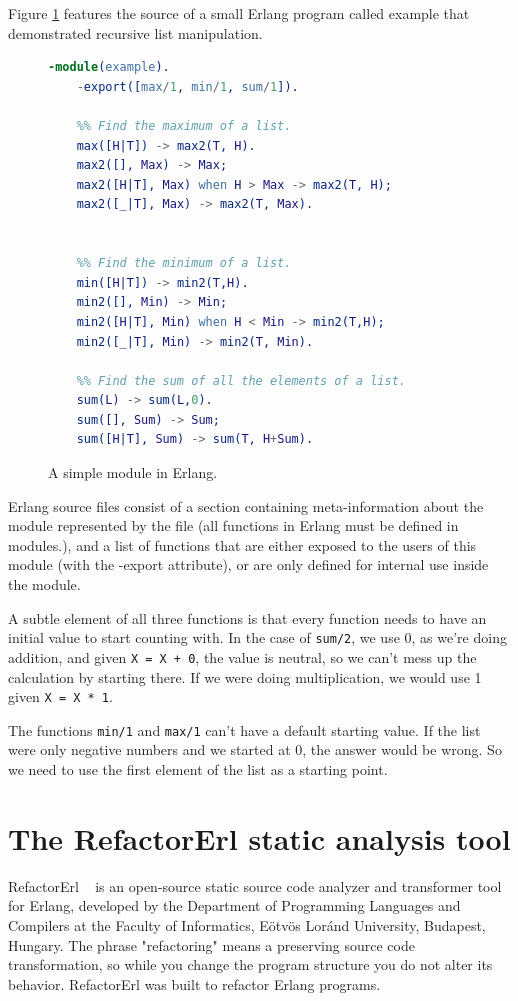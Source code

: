 Figure \ref{fig:example_erlang} features the source of a small Erlang program
called example that demonstrated recursive list manipulation.
\begin{figure}[ht]
	\begin{lstlisting}[extendedchars=true, language=Erlang, basicstyle=\footnotesize\ttfamily, keywordstyle=\color{red}]
	-module(example). 
	-export([max/1, min/1, sum/1]).
	
	%% Find the maximum of a list.
	max([H|T]) -> max2(T, H).
	max2([], Max) -> Max;
	max2([H|T], Max) when H > Max -> max2(T, H);
	max2([_|T], Max) -> max2(T, Max).
	

	%% Find the minimum of a list.
	min([H|T]) -> min2(T,H).
	min2([], Min) -> Min;
	min2([H|T], Min) when H < Min -> min2(T,H);
	min2([_|T], Min) -> min2(T, Min).
	
	%% Find the sum of all the elements of a list.
	sum(L) -> sum(L,0).
	sum([], Sum) -> Sum;
	sum([H|T], Sum) -> sum(T, H+Sum).
	\end{lstlisting}
\caption{A simple module in Erlang.}
\label{fig:example_erlang}
\end{figure}

Erlang source files consist of a section containing meta-information about the module represented by the file (all functions in Erlang must be defined in
modules.), and a list of functions that are either exposed to the users of this module (with the -export attribute), or are only defined for internal use inside the module.  

A subtle element of all three functions is that every function needs to have an initial value to start counting with. In the case of \texttt{sum/2}, we use 0, as we’re doing addition, and given \texttt{X = X + 0}, the value is neutral, so we can’t mess up the calculation by starting there. If we were doing multiplication, we would use 1 given \texttt{X = X * 1}. 

The functions \texttt{min/1} and \texttt{max/1} can’t have a default starting value. If the list were only negative numbers and we started at 0, the answer would be wrong. So we need to use the first element of the list as a starting point.

\section{The RefactorErl static analysis tool} 

RefactorErl ~\cite{refactorerl1, refactorerl2} is an open-source static source code analyzer and transformer tool for Erlang, developed by the Department of Programming Languages and Compilers at the Faculty of Informatics, Eötvös Loránd University, Budapest, Hungary. The phrase "refactoring" means a preserving source code transformation, so while you change the program structure you do not alter its behavior. RefactorErl was built to refactor Erlang programs.

